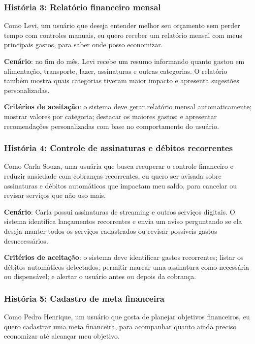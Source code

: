 \subsubsection{História 3: Relatório financeiro mensal}

Como Levi, um usuário que deseja entender melhor seu orçamento sem perder tempo com controles manuais, eu quero receber um relatório mensal com meus principais gastos, para saber onde posso economizar.

\textbf{Cenário}: no fim do mês, Levi recebe um resumo informando quanto gastou em alimentação, transporte, lazer, assinaturas e outras categorias. O relatório também mostra quais categorias tiveram maior impacto e apresenta sugestões personalizadas.

\textbf{Critérios de aceitação}: o sistema deve gerar relatório mensal automaticamente; mostrar valores por categoria; destacar os maiores gastos; e apresentar recomendações personalizadas com base no comportamento do usuário.

\subsubsection{História 4: Controle de assinaturas e débitos recorrentes}

Como Carla Souza, uma usuária que busca recuperar o controle financeiro e reduzir ansiedade com cobranças recorrentes, eu quero ser avisada sobre assinaturas e débitos automáticos que impactam meu saldo, para cancelar ou revisar serviços que não uso mais.

\textbf{Cenário}: Carla possui assinaturas de streaming e outros serviços digitais. O sistema identifica lançamentos recorrentes e envia um aviso perguntando se ela deseja manter todos os serviços cadastrados ou revisar possíveis gastos desnecessários.

\textbf{Critérios de aceitação}: o sistema deve identificar gastos recorrentes; listar os débitos automáticos detectados; permitir marcar uma assinatura como necessária ou dispensável; e alertar o usuário antes ou depois da cobrança.

\subsubsection{História 5: Cadastro de meta financeira}

Como Pedro Henrique, um usuário que gosta de planejar objetivos financeiros, eu quero cadastrar uma meta financeira, para acompanhar quanto ainda preciso economizar até alcançar meu objetivo.

